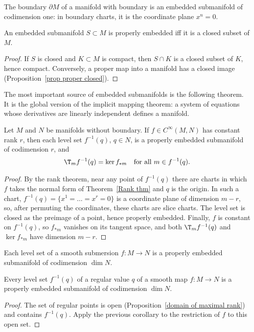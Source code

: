 \begin{cor}
    The boundary $\partial M$ of a manifold with boundary is an embedded submanifold of codimension one: in boundary charts, it is the coordinate plane $x^n=0$.
\end{cor}

\begin{prop}\label{prop properly embedded closed}
    An embedded submanifold $S\subset M$ is properly embedded iff it is a closed subset of $M$.
\end{prop}
\begin{proof}
    If $S$ is closed and $K\subset M$ is compact, then $S\cap K$ is a closed subset of $K$, hence compact. Conversely, a proper map into a manifold has a closed image (Proposition~\ref{prop proper closed}).
\end{proof}

The most important source of embedded submanifolds is the following theorem. It is the global version of the implicit mapping theorem: a system of equations whose derivatives are linearly independent defines a manifold.

\begin{thm}\label{thm level set submanifold}
    Let $M$ and $N$ be manifolds without boundary. If $f\in C^\infty(M,N)$ has constant rank $r$, then each level set $f^{-1}(q)$, $q\in N$, is a properly embedded submanifold of codimension $r$, and
    \[\T_mf^{-1}(q)=\ker f_{\ast m}\quad\text{for all }m\in f^{-1}(q).\]
\end{thm}
\begin{proof}
    By the rank theorem, near any point of $f^{-1}(q)$ there are charts in which $f$ takes the normal form of Theorem~\ref{Rank thm} and $q$ is the origin. In such a chart, $f^{-1}(q)=\{x^1=\ldots=x^r=0\}$ is a coordinate plane of dimension $m-r$, so, after permuting the coordinates, these charts are slice charts. The level set is closed as the preimage of a point, hence properly embedded. Finally, $f$ is constant on $f^{-1}(q)$, so $f_{\ast m}$ vanishes on its tangent space, and both $\T_mf^{-1}(q)$ and $\ker f_{\ast m}$ have dimension $m-r$.
\end{proof}

\begin{cor}
    Each level set of a smooth submersion $f:M\to N$ is a properly embedded submanifold of codimension $\dim N$.
\end{cor}

\begin{cor}\label{thm regular level set}
    Every level set $f^{-1}(q)$ of a regular value $q$ of a smooth map $f:M\to N$ is a properly embedded submanifold of codimension $\dim N$.
\end{cor}
\begin{proof}
    The set of regular points is open (Proposition~\ref{domain of maximal rank}) and contains $f^{-1}(q)$. Apply the previous corollary to the restriction of $f$ to this open set.
\end{proof}


